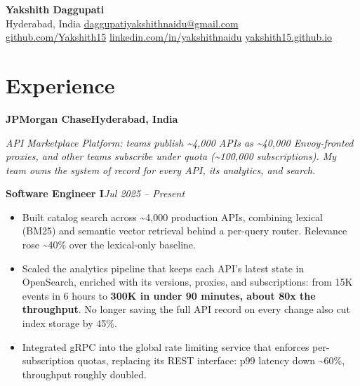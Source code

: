 \documentclass[letterpaper,10pt]{article}
\newcommand{\role}[2]{%
  \textbf{#1}\hfill\textit{#2}\par\vspace{0.15em}%
}
\newcommand{\org}[2]{%
  \textbf{#1}\hfill\textbf{#2}\par\vspace{0.1em}%
}
\begin{document}
\begin{center}
  {\LARGE\bfseries Yakshith Daggupati}\\[0.45em]
  Hyderabad, India \textbullet{} %
  \href{mailto:daggupatiyakshithnaidu@gmail.com}{daggupatiyakshithnaidu@gmail.com}\\[0.25em]
  \href{https://github.com/Yakshith15}{github.com/Yakshith15} \textbullet{} %
  \href{https://www.linkedin.com/in/yakshithnaidu/}{linkedin.com/in/yakshithnaidu} \textbullet{} %
  \href{https://yakshith15.github.io}{yakshith15.github.io}
\end{center}

\vspace{0.4em}

\section{Experience}

\org{JPMorgan Chase}{Hyderabad, India}
{\small\itshape API Marketplace Platform: teams publish \textasciitilde4,000 APIs as
\textasciitilde40,000 Envoy-fronted proxies, and other teams subscribe under quota
(\textasciitilde100,000 subscriptions). My team owns the system of record for every API,
its analytics, and search.\par}
\vspace{0.35em}

\role{Software Engineer I}{Jul 2025 -- Present}
\begin{itemize}
  \item Built catalog search across \textasciitilde4,000 production APIs, combining lexical
        (BM25) and semantic vector retrieval behind a per-query router. Relevance rose
        \textasciitilde40\% over the lexical-only baseline.
  \item Scaled the analytics pipeline that keeps each API's latest state in OpenSearch, enriched
        with its versions, proxies, and subscriptions: from 15K events in 6 hours to
        \textbf{300K in under 90 minutes, about 80x the throughput}. No longer saving the full
        API record on every change also cut index storage by 45\%.
  \item Integrated gRPC into the global rate limiting service that enforces per-subscription
        quotas, replacing its REST interface: p99 latency down \textasciitilde60\%,
        throughput roughly doubled.
\end{itemize}
\end{document}
